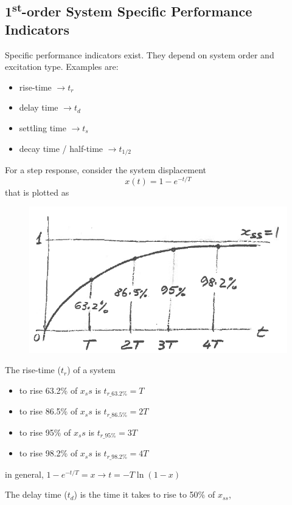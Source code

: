 \documentclass[12pt,letter]{article}
\numberwithin{ex}{section} %
\numberwithin{re}{section} %
\numberwithin{equation}{section}	%
\begin{document}
\subsection{1\textsuperscript{st}-order System Specific Performance Indicators}


Specific performance indicators exist. They depend on system order and excitation type. Examples are:
\begin{itemize}
	\item rise-time $ \rightarrow t_r$
	\item delay time  $ \rightarrow t_d$
	\item settling time $ \rightarrow t_s$
	\item decay time / half-time $ \rightarrow t_{1/2}$
\end{itemize}

For a step response, consider the system displacement
\begin{equation}
x(t) = 1-e^{-t/T}
\end{equation}
that is plotted as
\begin{figure}[H]
	\centering
	\includegraphics[width=4.5in]{../figures/system_specific_performance_indicator_rise_time}
\end{figure}

The rise-time ($t_r$) of a system
\begin{itemize}
\item to rise 63.2\% of $x_ss$ is $t_{r\_63.2\%} = T$
\item to rise 86.5\% of $x_ss$ is $t_{r\_86.5\%} = 2T$
\item to rise 95\% of $x_ss$ is $t_{r\_95\%} = 3T$
\item to rise 98.2\% of $x_ss$ is $t_{r\_98.2\%} = 4T$
\end{itemize}
in general, $1-e^{-t/T} = x \rightarrow t = -T \ln(1-x)$ 

The delay time ($t_d$) is the time it takes to rise to 50\% of $x_{ss}$, 
\end{document}
